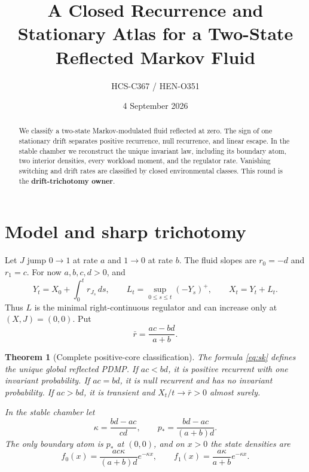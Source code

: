 \documentclass[10pt]{article}
\title{A Closed Recurrence and Stationary Atlas for a Two-State Reflected Markov Fluid}
\author{HCS-C367 / HEN-O351}
\date{4 September 2026}
\newtheorem{theorem}{Theorem}
\begin{document}
\maketitle
\begin{abstract}
We classify a two-state Markov-modulated fluid reflected at zero.  The sign of
one stationary drift separates positive recurrence, null recurrence, and
linear escape.  In the stable chamber we reconstruct the unique invariant law,
including its boundary atom, two interior densities, every workload moment,
and the regulator rate.  Vanishing switching and drift rates are classified by
closed environmental classes.  This round is the \textbf{drift-trichotomy owner}.
\end{abstract}

\section{Model and sharp trichotomy}
Let $J$ jump $0\to1$ at rate $a$ and $1\to0$ at rate $b$.  The fluid slopes
are $r_0=-d$ and $r_1=c$.  For now $a,b,c,d>0$, and
\begin{equation}\label{eq:sk}
 Y_t=X_0+\int_0^t r_{J_s}\,ds,\qquad
 L_t=\sup_{0\le s\le t}(-Y_s)^+ ,\qquad X_t=Y_t+L_t.
\end{equation}
Thus $L$ is the minimal right-continuous regulator and can increase only at
$(X,J)=(0,0)$.  Put
\begin{equation}\label{eq:drift}
 \bar r=\frac{ac-bd}{a+b}.
\end{equation}

\begin{theorem}[Complete positive-core classification]\label{thm:core}
The formula \eqref{eq:sk} defines the unique global reflected PDMP.  If
$ac<bd$, it is positive recurrent with one invariant probability.  If
$ac=bd$, it is null recurrent and has no invariant probability.  If $ac>bd$,
it is transient and $X_t/t\to\bar r>0$ almost surely.

In the stable chamber let
\[
 \kappa=\frac{bd-ac}{cd},\qquad
 p_*=\frac{bd-ac}{(a+b)d}.
\]
The only boundary atom is $p_*$ at $(0,0)$, and on $x>0$ the state densities are
\begin{equation}\label{eq:density}
 f_0(x)=\frac{ac\kappa}{(a+b)d}e^{-\kappa x},\qquad
 f_1(x)=\frac{a\kappa}{a+b}e^{-\kappa x}.
\end{equation}
\end{theorem}
\end{document}
